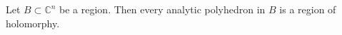 Let $B \subset \mathbb{C}^n$ be a region. Then every analytic polyhedron in $B$ is a region of holomorphy.
